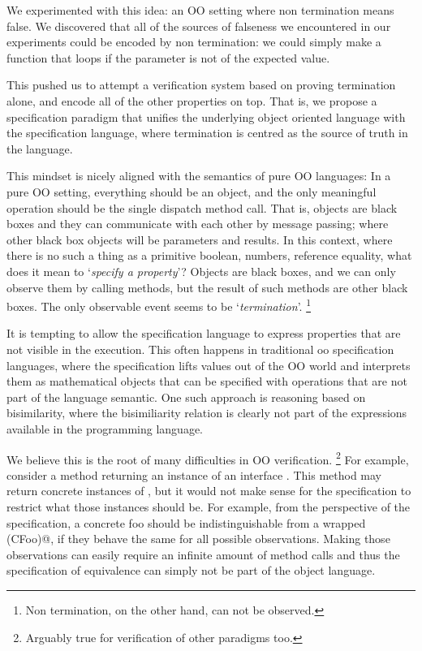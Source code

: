 \documentclass[runningheads]{llncs}
\begin{document}
We experimented with this idea: an OO setting where non termination means false. We discovered that all of the sources of falseness we encountered in our experiments could be encoded by non termination: we could simply make a function that loops if the parameter is not of the expected value.

This pushed us to attempt a verification system based on proving termination alone, and encode all of the other properties on top.
That is, we propose a specification paradigm that unifies the underlying object oriented language with the specification language, where termination is centred as the source of truth in the language.

This mindset is nicely aligned with the semantics of pure OO languages:
In a pure OO setting, everything should be an object, and the only meaningful operation should be the single dispatch method call.
That is, objects are black boxes and they can communicate with each other by message passing; where other black box objects will be parameters and results.
In this context, where there is no such a thing as a primitive boolean, numbers, reference equality, what does it mean to `\emph{specify a property}'?
Objects are black boxes, and we can only observe them by calling methods, but the result of such methods are other black boxes.
The only observable event seems to be `\emph{termination}'. \footnote{Non termination, on the other hand, can not be observed.}

It is tempting to allow the specification language to express properties that are not visible in the execution. This often happens in traditional oo specification languages, where the specification lifts values out of the OO world and interprets them as mathematical objects that can be specified with operations that are not part of the language semantic.
One such approach is reasoning based on bisimilarity, where the bisimiliarity relation is clearly not part of the expressions available in the programming language.

We believe this is the root of many difficulties in OO verification.
\footnote{ Arguably true for verification of other paradigms too.}
For example, consider a method returning an instance of an interface \Q@Foo@.
This method may return concrete instances of \Q@Foo@, but it would not make sense for the specification to restrict what those instances should be.
For example, from the perspective of the specification, a concrete foo \Q@CFoo@ should be indistinguishable from a wrapped \Q@D(CFoo)@, if they behave the same for all possible observations.
Making those observations can easily require an infinite amount of method calls and thus the specification of equivalence can simply not be part of the object language.
\end{document}
